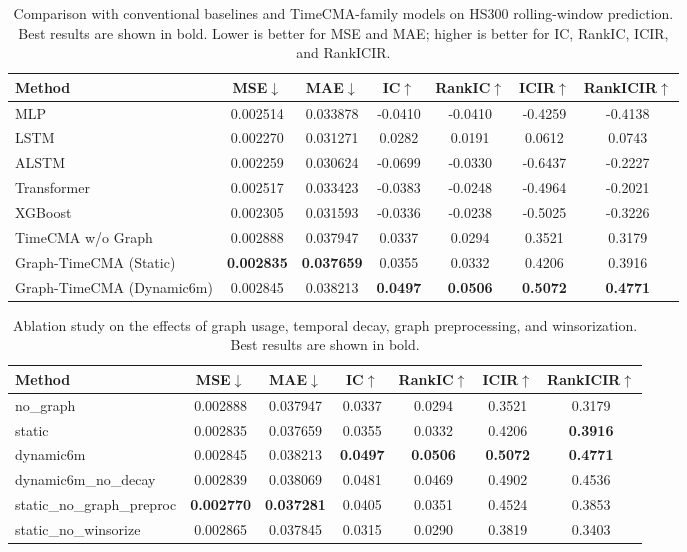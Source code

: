 \documentclass[11pt]{article}
\begin{document}
\begin{table}[t]
\centering
\small
\setlength{\tabcolsep}{8pt}
\caption{Comparison with conventional baselines and TimeCMA-family models on HS300 rolling-window prediction. Best results are shown in bold. Lower is better for MSE and MAE; higher is better for IC, RankIC, ICIR, and RankICIR.}
\label{tab:main_results}
\begin{tabular}{lcccccc}
\toprule
Method & MSE$\downarrow$ & MAE$\downarrow$ & IC$\uparrow$ & RankIC$\uparrow$ & ICIR$\uparrow$ & RankICIR$\uparrow$ \\
\midrule
MLP & 0.002514 & 0.033878 & -0.0410 & -0.0410 & -0.4259 & -0.4138 \\
LSTM & 0.002270 & 0.031271 & 0.0282 & 0.0191 & 0.0612 & 0.0743 \\
ALSTM & 0.002259 & 0.030624 & -0.0699 & -0.0330 & -0.6437 & -0.2227 \\
Transformer & 0.002517 & 0.033423 & -0.0383 & -0.0248 & -0.4964 & -0.2021 \\
XGBoost & 0.002305 & 0.031593 & -0.0336 & -0.0238 & -0.5025 & -0.3226 \\
\midrule
TimeCMA w/o Graph & 0.002888 & 0.037947 & 0.0337 & 0.0294 & 0.3521 & 0.3179 \\
Graph-TimeCMA (Static) & \textbf{0.002835} & \textbf{0.037659} & 0.0355 & 0.0332 & 0.4206 & 0.3916 \\
Graph-TimeCMA (Dynamic6m) & 0.002845 & 0.038213 & \textbf{0.0497} & \textbf{0.0506} & \textbf{0.5072} & \textbf{0.4771} \\
\bottomrule
\end{tabular}
\end{table}

\begin{table}[t]
\centering
\small
\setlength{\tabcolsep}{8pt}
\caption{Ablation study on the effects of graph usage, temporal decay, graph preprocessing, and winsorization. Best results are shown in bold.}
\label{tab:ablation_results}
\begin{tabular}{lcccccc}
\toprule
Method & MSE$\downarrow$ & MAE$\downarrow$ & IC$\uparrow$ & RankIC$\uparrow$ & ICIR$\uparrow$ & RankICIR$\uparrow$ \\
\midrule
no\_graph & 0.002888 & 0.037947 & 0.0337 & 0.0294 & 0.3521 & 0.3179 \\
static & 0.002835 & 0.037659 & 0.0355 & 0.0332 & 0.4206 & \textbf{0.3916} \\
dynamic6m & 0.002845 & 0.038213 & \textbf{0.0497} & \textbf{0.0506} & \textbf{0.5072} & \textbf{0.4771} \\
dynamic6m\_no\_decay & 0.002839 & 0.038069 & 0.0481 & 0.0469 & 0.4902 & 0.4536 \\
static\_no\_graph\_preproc & \textbf{0.002770} & \textbf{0.037281} & 0.0405 & 0.0351 & 0.4524 & 0.3853 \\
static\_no\_winsorize & 0.002865 & 0.037845 & 0.0315 & 0.0290 & 0.3819 & 0.3403 \\
\bottomrule
\end{tabular}
\end{table}
\end{document}

